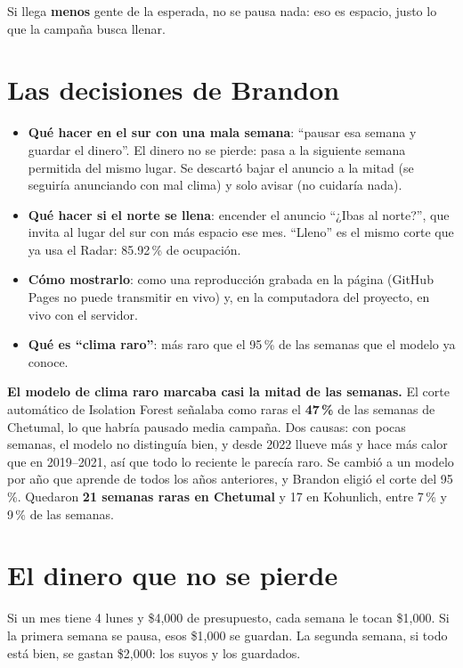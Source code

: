 Si llega \textbf{menos} gente de la esperada, no se pausa nada: eso es espacio, justo lo que la campaña busca llenar.

\section{Las decisiones de Brandon}
\begin{itemize}
\item \textbf{Qué hacer en el sur con una mala semana}: ``pausar esa semana y guardar el dinero''. El dinero no se pierde:
  pasa a la siguiente semana permitida del mismo lugar. Se descartó bajar el anuncio a la mitad (se seguiría anunciando con
  mal clima) y solo avisar (no cuidaría nada).
\item \textbf{Qué hacer si el norte se llena}: encender el anuncio ``¿Ibas al norte?'', que invita al lugar del sur con más
  espacio ese mes. ``Lleno'' es el mismo corte que ya usa el Radar: 85.92\,\% de ocupación.
\item \textbf{Cómo mostrarlo}: como una reproducción grabada en la página (GitHub Pages no puede transmitir en vivo) y,
  en la computadora del proyecto, en vivo con el servidor.
\item \textbf{Qué es ``clima raro''}: más raro que el 95\,\% de las semanas que el modelo ya conoce.
\end{itemize}

\begin{error}
\textbf{El modelo de clima raro marcaba casi la mitad de las semanas.} El corte automático de Isolation Forest señalaba como
raras el \textbf{47\,\%} de las semanas de Chetumal, lo que habría pausado media campaña. Dos causas: con pocas semanas, el
modelo no distinguía bien, y desde 2022 llueve más y hace más calor que en 2019–2021, así que todo lo reciente le parecía
raro. Se cambió a un modelo por año que aprende de todos los años anteriores, y Brandon eligió el corte del 95\,\%. Quedaron
\textbf{21 semanas raras en Chetumal} y 17 en Kohunlich, entre 7\,\% y 9\,\% de las semanas.
\end{error}

\section{El dinero que no se pierde}
\begin{ejemplo}
Si un mes tiene 4 lunes y \$4,000 de presupuesto, cada semana le tocan \$1,000. Si la primera semana se pausa, esos
\$1,000 se guardan. La segunda semana, si todo está bien, se gastan \$2,000: los suyos y los guardados.
\end{ejemplo}


